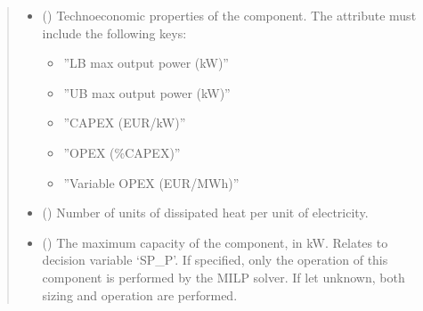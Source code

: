 \documentclass[letterpaper,10pt,english]{sphinxmanual}
\begin{document}
\begin{fulllineitems}
\begin{fulllineitems}
\begin{quote}
\begin{description}
\begin{itemize}
\item {} 
\sphinxAtStartPar
{} (\sphinxstyleliteralemphasis{\sphinxupquote{ | }}) \textendash{} 
\sphinxAtStartPar
Techno\sphinxhyphen{}economic properties of the component.
The  attribute must include the following keys:
\begin{itemize}
\item {} 
\sphinxAtStartPar
”LB max output power (kW)”

\item {} 
\sphinxAtStartPar
”UB max output power (kW)”

\item {} 
\sphinxAtStartPar
”CAPEX (EUR/kW)”

\item {} 
\sphinxAtStartPar
”OPEX (\%CAPEX)”

\item {} 
\sphinxAtStartPar
”Variable OPEX (EUR/MWh)”

\end{itemize}


\item {} 
\sphinxAtStartPar
{} (\sphinxstyleliteralemphasis{\sphinxupquote{, }}\sphinxstyleliteralemphasis{\sphinxupquote{, }}\sphinxstyleliteralemphasis{\sphinxupquote{, }}) \textendash{} Number of units of dissipated heat per unit of electricity.

\item {} 
\sphinxAtStartPar
{} (\sphinxstyleliteralemphasis{\sphinxupquote{, }}) \textendash{} The maximum capacity of the component, in kW.
Relates to decision variable ‘SP\_P’.
If specified, only the operation of this component is performed by the MILP solver.
If let unknown, both sizing and operation are performed.


\end{itemize}
\end{description}
\end{quote}
\end{fulllineitems}
\end{fulllineitems}
\end{document}
